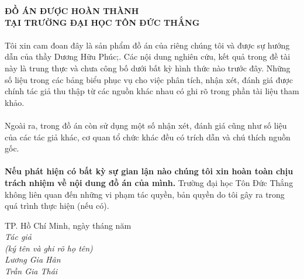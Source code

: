 	\begin{center}
		\fontsize{16}{20}\selectfont
		\textbf{ĐỒ ÁN ĐƯỢC HOÀN THÀNH}\\
		\textbf{TẠI TRƯỜNG ĐẠI HỌC TÔN ĐỨC THẮNG\\} 
	\end{center}
	\fontsize{13}{13}\selectfont
	\paragraph{}
	Tôi xin cam đoan đây là sản phẩm đồ án của riêng chúng tôi và được sự hướng dẫn của thầy Dương Hữu Phúc;. Các nội dung nghiên cứu, kết quả trong đề tài này là trung thực và chưa công bố dưới bất kỳ hình thức nào trước đây. Những số liệu trong các bảng biểu phục vụ cho việc phân tích, nhận xét, đánh giá được chính tác giả thu thập từ các nguồn khác nhau có ghi rõ trong phần tài liệu tham khảo.
	\paragraph{}
	Ngoài ra, trong đồ án còn sử dụng một số nhận xét, đánh giá cũng như số liệu của các tác giả khác, cơ quan tổ chức khác đều có trích dẫn và chú thích nguồn gốc.
	\paragraph{}
	\textbf{Nếu phát hiện có bất kỳ sự gian lận nào chúng tôi xin hoàn toàn chịu trách nhiệm về nội dung đồ án của mình.} Trường đại học Tôn Đức Thắng không liên quan đến những vi phạm tác quyền, bản quyền do tôi gây ra trong quá trình thực hiện (nếu có).
	\begin{flushright}
		TP. Hồ Chí Minh,  ngày   tháng   năm   \\ 
		\textit{Tác giả\\
			(ký tên và ghi rõ họ tên)\\
			\vspace{1.5cm}
			Lương Gia Hân\\
			\vspace{1.5cm}
			Trần Gia Thái\\
			\vspace{1.5cm}}
	\end{flushright}
	\pagebreak
	
